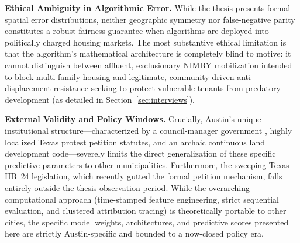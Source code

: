 \documentclass[11pt, letterpaper]{article}
\begin{document}
\textbf{Ethical Ambiguity in Algorithmic Error.} While the thesis presents formal spatial error distributions, neither geographic symmetry nor false-negative parity constitutes a robust fairness guarantee when algorithms are deployed into politically charged housing markets. The most substantive ethical limitation is that the algorithm's mathematical architecture is completely blind to motive: it cannot distinguish between affluent, exclusionary NIMBY mobilization intended to block multi-family housing and legitimate, community-driven anti-displacement resistance seeking to protect vulnerable tenants from predatory development (as detailed in Section~\ref{sec:interviews}).  

\textbf{External Validity and Policy Windows.} Crucially, Austin's unique institutional structure—characterized by a council-manager government \cite{cityaustin2010}, highly localized Texas protest petition statutes, and an archaic continuous land development code—severely limits the direct generalization of these specific predictive parameters to other municipalities. Furthermore, the sweeping Texas HB~24 legislation, which recently gutted the formal petition mechanism, falls entirely outside the thesis observation period. While the overarching computational approach (time-stamped feature engineering, strict sequential evaluation, and clustered attribution tracing) is theoretically portable to other cities, the specific model weights, architectures, and predictive scores presented here are strictly Austin-specific and bounded to a now-closed policy era.
\end{document}
